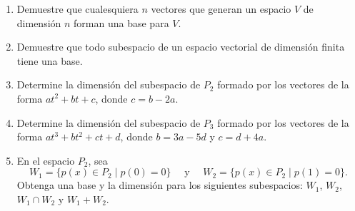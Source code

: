 \begin{enumerate}[resume]
    \item Demuestre que cualesquiera $n$ vectores que generan un espacio $V$ de dimensión $n$ forman una base para $V$.
    \item Demuestre que todo subespacio de un espacio vectorial de dimensión finita tiene una base.
    \item Determine la dimensión del subespacio de $P_2$ formado por los vectores de la forma $at^2 + bt + c$, donde $c = b - 2a$.
    \item Determine la dimensión del subespacio de $P_3$ formado por los vectores de la forma $at^3 + bt^2 + ct + d$, donde $b = 3a - 5d$ y $c = d + 4a$.
    \item En el espacio $P_2$, sea
    $$W_1 = \{ p(x) \in P_2 \mid p(0) = 0 \} \quad \text{ y } \quad W_2 = \{ p(x) \in P_2 \mid p(1) = 0 \}.$$
    Obtenga una base y la dimensión para los siguientes subespacios: $W_1$, $W_2$, $W_1 \cap W_2$ y $W_1 + W_2$.
\end{enumerate}